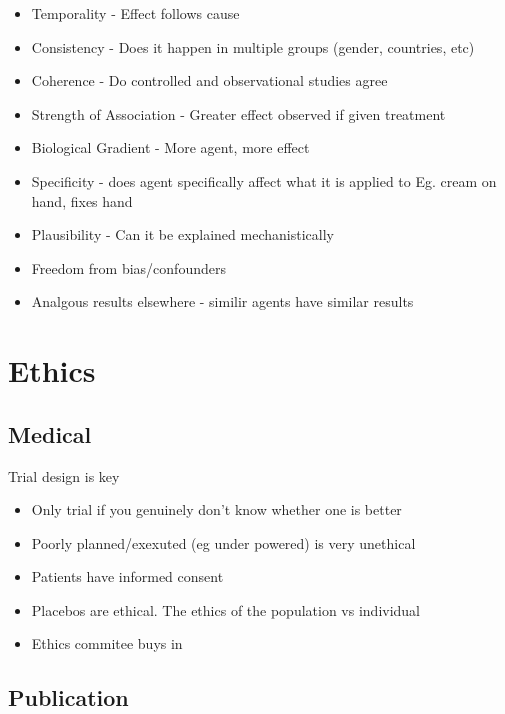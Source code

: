 \documentclass[
  letterpaper,
  DIV=11,
  numbers=noendperiod]{scrreprt}
\providecommand{\tightlist}{%
  \setlength{\itemsep}{0pt}\setlength{\parskip}{0pt}}\usepackage{longtable,booktabs,array}
\begin{document}
\begin{itemize}
\tightlist
\item
  Temporality - Effect follows cause
\item
  Consistency - Does it happen in multiple groups (gender, countries,
  etc)
\item
  Coherence - Do controlled and observational studies agree
\item
  Strength of Association - Greater effect observed if given treatment
\item
  Biological Gradient - More agent, more effect
\item
  Specificity - does agent specifically affect what it is applied to Eg.
  cream on hand, fixes hand
\item
  Plausibility - Can it be explained mechanistically
\item
  Freedom from bias/confounders
\item
  Analgous results elsewhere - similir agents have similar results
\end{itemize}

\hypertarget{ethics}{%
\section{Ethics}\label{ethics}}

\hypertarget{medical}{%
\subsection{Medical}\label{medical}}

Trial design is key

\begin{itemize}
\tightlist
\item
  Only trial if you genuinely don't know whether one is better
\item
  Poorly planned/exexuted (eg under powered) is very unethical
\item
  Patients have informed consent
\item
  Placebos are ethical. The ethics of the population vs individual
\item
  Ethics commitee buys in
\end{itemize}

\hypertarget{publication}{%
\subsection{Publication}\label{publication}}
\end{document}
